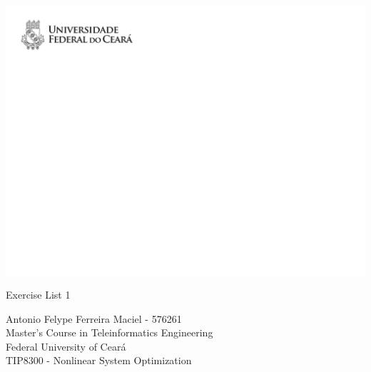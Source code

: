 \documentclass[11pt,a4paper]{article}
\begin{document}
\thispagestyle{empty}

\begin{flushleft} \includegraphics[width=1.0\textwidth]{headers}   \end{flushleft}

\vskip0.5cm
\begin{spacing}{2} {\Large\sc\noindent Exercise List 1}
\end{spacing}

\vfill

\begin{spacing}{1.2}
{\large\sc  Antonio Felype Ferreira Maciel - 576261}\\

{\noindent \large \sc Master's Course in Teleinformatics Engineering}\\
{\noindent \large \sc Federal University of Ceará}\\

{\noindent \large \sc TIP8300 - Nonlinear System Optimization}
\end{spacing}

\newpage 


\newpage

\end{document}
